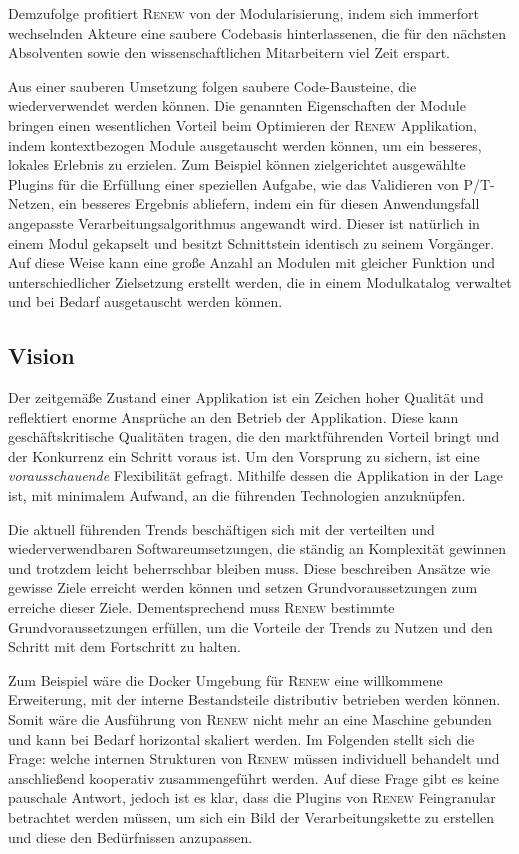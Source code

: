 	Demzufolge profitiert \textsc{Renew} von der Modularisierung, indem sich immerfort wechselnden Akteure eine saubere Codebasis hinterlassenen, die für den nächsten Absolventen sowie den wissenschaftlichen Mitarbeitern viel Zeit erspart. \bigbreak

	Aus einer sauberen Umsetzung folgen saubere Code-Bausteine, die wiederverwendet werden können. Die genannten Eigenschaften der Module bringen einen wesentlichen Vorteil beim Optimieren der \textsc{Renew} Applikation, indem kontextbezogen Module ausgetauscht werden können, um ein besseres, lokales Erlebnis zu erzielen. Zum Beispiel können zielgerichtet ausgewählte Plugins für die Erfüllung einer speziellen Aufgabe, wie das Validieren von P/T-Netzen, ein besseres Ergebnis abliefern, indem ein für diesen Anwendungsfall angepasste Verarbeitungsalgorithmus angewandt wird. Dieser ist natürlich in einem Modul gekapselt und besitzt Schnittstein identisch zu seinem Vorgänger. Auf diese Weise kann eine große Anzahl an Modulen mit gleicher Funktion und unterschiedlicher Zielsetzung erstellt werden, die in einem Modulkatalog verwaltet und bei Bedarf ausgetauscht werden können.

\subsection{Vision} \label{sub:moderner_zustand}
	Der zeitgemäße Zustand einer Applikation ist ein Zeichen hoher Qualität und reflektiert enorme Ansprüche an den Betrieb der Applikation. Diese kann geschäftskritische Qualitäten tragen, die den marktführenden Vorteil bringt und der Konkurrenz ein Schritt voraus ist. Um den Vorsprung zu sichern, ist eine \textit{vorausschauende} Flexibilität gefragt. Mithilfe dessen die Applikation in der Lage ist, mit minimalem Aufwand, an die führenden Technologien anzuknüpfen. 

	Die aktuell führenden Trends beschäftigen sich mit der verteilten und wiederverwendbaren Softwareumsetzungen, die ständig an Komplexität gewinnen und trotzdem leicht beherrschbar bleiben muss. Diese beschreiben Ansätze wie gewisse Ziele erreicht werden können und setzen Grundvoraussetzungen zum erreiche dieser Ziele. Dementsprechend muss \textsc{Renew} bestimmte Grundvoraussetzungen erfüllen, um die Vorteile der Trends zu Nutzen und den Schritt mit dem Fortschritt zu halten.  \bigbreak

	Zum Beispiel wäre die Docker Umgebung für \textsc{Renew} eine willkommene Erweiterung, mit der interne Bestandsteile distributiv betrieben werden können. Somit wäre die Ausführung von \textsc{Renew} nicht mehr an eine Maschine gebunden und kann bei Bedarf horizontal skaliert werden. Im Folgenden stellt sich die Frage: welche internen Strukturen von \textsc{Renew} müssen individuell behandelt und anschließend kooperativ zusammengeführt werden. Auf diese Frage gibt es keine pauschale Antwort, jedoch ist es klar, dass die Plugins von \textsc{Renew} Feingranular betrachtet werden müssen, um sich ein Bild der Verarbeitungskette zu erstellen und diese den Bedürfnissen anzupassen. \bigbreak

